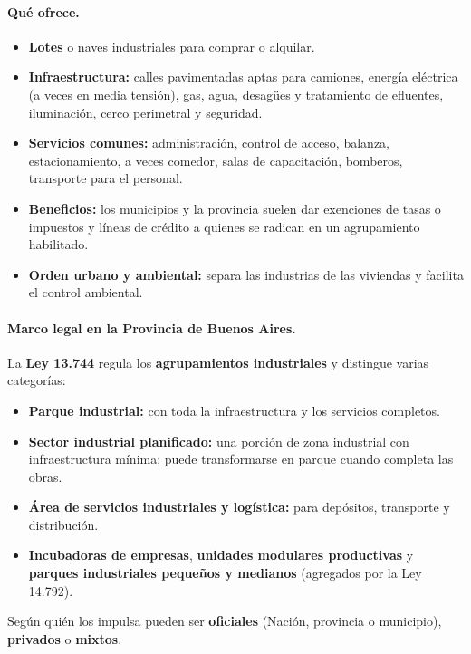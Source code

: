 \paragraph*{Qué ofrece.}
\begin{itemize}
  \item \textbf{Lotes} o naves industriales para comprar o alquilar.
  \item \textbf{Infraestructura:} calles pavimentadas aptas para camiones, energía eléctrica
        (a veces en media tensión), gas, agua, desagües y tratamiento de efluentes,
        iluminación, cerco perimetral y seguridad.
  \item \textbf{Servicios comunes:} administración, control de acceso, balanza, estacionamiento,
        a veces comedor, salas de capacitación, bomberos, transporte para el personal.
  \item \textbf{Beneficios:} los municipios y la provincia suelen dar exenciones de tasas o
        impuestos y líneas de crédito a quienes se radican en un agrupamiento habilitado.
  \item \textbf{Orden urbano y ambiental:} separa las industrias de las viviendas y facilita el
        control ambiental.
\end{itemize}

\paragraph*{Marco legal en la Provincia de Buenos Aires.}
La \textbf{Ley 13.744} regula los \textbf{agrupamientos industriales} y distingue varias
categorías:
\begin{itemize}
  \item \textbf{Parque industrial:} con toda la infraestructura y los servicios completos.
  \item \textbf{Sector industrial planificado:} una porción de zona industrial con
        infraestructura mínima; puede transformarse en parque cuando completa las obras.
  \item \textbf{Área de servicios industriales y logística:} para depósitos, transporte y
        distribución.
  \item \textbf{Incubadoras de empresas}, \textbf{unidades modulares productivas} y
        \textbf{parques industriales pequeños y medianos} (agregados por la Ley 14.792).
\end{itemize}
Según quién los impulsa pueden ser \textbf{oficiales} (Nación, provincia o municipio),
\textbf{privados} o \textbf{mixtos}.

